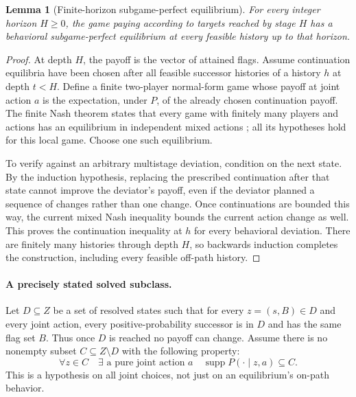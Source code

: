 \documentclass[11pt,a4paper]{article}
\newtheorem{lemma}[theorem]{Lemma}
\theoremstyle{definition}
\theoremstyle{remark}
\begin{document}
\begin{lemma}[Finite-horizon subgame-perfect equilibrium]
For every integer horizon $H\geq0$, the game paying according to targets reached by stage $H$ has a behavioral subgame-perfect equilibrium at every feasible history up to that horizon.
\end{lemma}
\begin{proof}
At depth $H$, the payoff is the vector of attained flags. Assume continuation equilibria have been chosen after all feasible successor histories of a history $h$ at depth $t<H$. Define a finite two-player normal-form game whose payoff at joint action $a$ is the expectation, under $P$, of the already chosen continuation payoff. The finite Nash theorem states that every game with finitely many players and actions has an equilibrium in independent mixed actions \cite{nash}; all its hypotheses hold for this local game. Choose one such equilibrium.

To verify against an arbitrary multistage deviation, condition on the next state. By the induction hypothesis, replacing the prescribed continuation after that state cannot improve the deviator's payoff, even if the deviator planned a sequence of changes rather than one change. Once continuations are bounded this way, the current mixed Nash inequality bounds the current action change as well. This proves the continuation inequality at $h$ for every behavioral deviation. There are finitely many histories through depth $H$, so backwards induction completes the construction, including every feasible off-path history.
\end{proof}

\paragraph{A precisely stated solved subclass.}
Let $D\subseteq Z$ be a set of resolved states such that for every $z=(s,B)\in D$ and every joint action, every positive-probability successor is in $D$ and has the same flag set $B$. Thus once $D$ is reached no payoff can change. Assume there is no nonempty subset $C\subseteq Z\setminus D$ with the following property:
\[
 \forall z\in C\quad\exists\text{ a pure joint action }a
 \quad \operatorname{supp}P(\cdot\mid z,a)\subseteq C. \tag{US}
\]
This is a hypothesis on all joint choices, not just on an equilibrium's on-path behavior.
\end{document}
